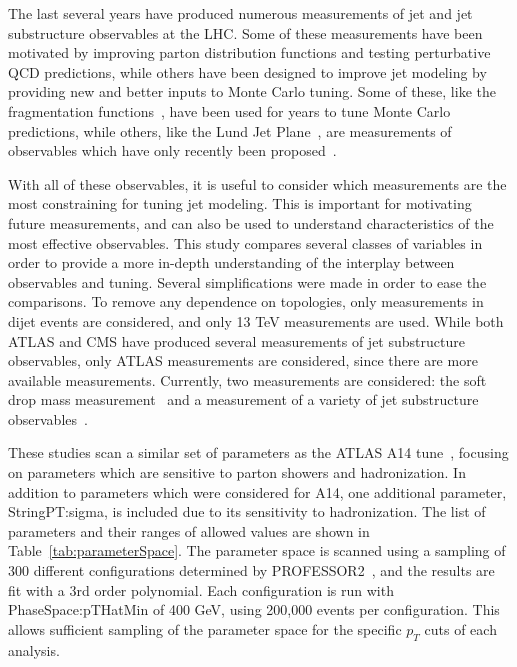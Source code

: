 The last several years have produced numerous measurements of jet and jet substructure observables at the LHC. 
Some of these measurements have been motivated by improving parton distribution functions and testing perturbative QCD predictions, 
while others have been designed to improve jet modeling by providing new and better inputs to Monte Carlo tuning.
Some of these, like the fragmentation functions~\cite{Aad:2019onw}, have been used for years to tune Monte Carlo predictions, 
while others, like the Lund Jet Plane~\cite{lundAtlas}, are measurements of observables which have only recently been proposed~\cite{lundPlane}.

With all of these observables, it is useful to consider which measurements are the most constraining for tuning jet modeling.
This is important for motivating future measurements, and can also be used to understand characteristics of the most effective observables.
This study compares several classes of variables in order to provide a more in-depth understanding of the interplay between observables and tuning.
Several simplifications were made in order to ease the comparisons. 
To remove any dependence on topologies, only measurements in dijet events are considered, and only 13 TeV measurements are used.
While both ATLAS and CMS have produced several measurements of jet substructure observables, only ATLAS measurements are considered, since there are more available measurements.
Currently, two measurements are considered: the soft drop mass measurement~\cite{Aaboud:2017qwh} and a measurement of a variety of jet substructure observables~\cite{Aaboud:2019aii}.


These studies scan a similar set of parameters as the ATLAS A14 tune~\cite{ATL-PHYS-PUB-2014-021}, focusing on parameters which are sensitive to parton showers and hadronization.
In addition to parameters which were considered for A14, one additional parameter, StringPT:sigma, is included due to its sensitivity to hadronization.
The list of parameters and their ranges of allowed values are shown in Table~\ref{tab:parameterSpace}.
The parameter space is scanned using a sampling of 300 different configurations determined by PROFESSOR2~\cite{Buckley:2009bj}, and the results are fit with a 3rd order polynomial.
Each configuration is run with PhaseSpace:pTHatMin of 400 GeV, using 200,000 events per configuration. 
This allows sufficient sampling of the parameter space for the specific $p_{T}$ cuts of each analysis. 

